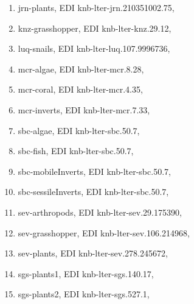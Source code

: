 \documentclass[11pt, oneside]{article}
\begin{document}
\begin{enumerate}
\item jrn-plants, EDI knb-lter-jrn.210351002.75, \cite{chapline_jornada_2017}
\item knz-grasshopper, EDI knb-lter-knz.29.12, \cite{knz-grasshoppers}
\item luq-snails, EDI knb-lter-luq.107.9996736, \cite{luq-snails}
\item mcr-algae, EDI knb-lter-mcr.8.28, \cite{mcr-algae}
\item mcr-coral, EDI knb-lter-mcr.4.35,  \cite{mcr-coral}
\item mcr-inverts, EDI knb-lter-mcr.7.33,  \cite{mcr-inverts}
\item sbc-algae, EDI knb-lter-sbc.50.7,  \cite{sbc}
\item sbc-fish, EDI knb-lter-sbc.50.7,  \cite{sbc}
\item sbc-mobileInverts, EDI knb-lter-sbc.50.7, \cite{sbc}
\item sbc-sessileInverts, EDI knb-lter-sbc.50.7,  \cite{sbc}
\item sev-arthropods, EDI knb-lter-sev.29.175390,  \cite{lightfoot_ground_2013}
\item sev-grasshopper, EDI knb-lter-sev.106.214968,  \cite{sev-grasshopper}
\item sev-plants, EDI knb-lter-sev.278.245672,  \cite{sev-plants}
\item sgs-plants1, EDI knb-lter-sgs.140.17,  \cite{sgs-plants}
\item sgs-plants2, EDI knb-lter-sgs.527.1,  \cite{milchunas_sgs-lter_2014}
\end{enumerate}
\end{document}
